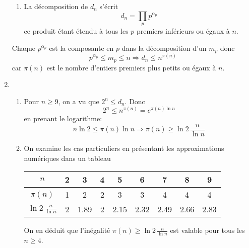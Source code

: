 \begin{enumerate}
\begin{enumerate}
 \item   La décomposition de $d_n$ s'écrit
\begin{displaymath}
 d_n = \prod_p p^{\alpha_p}
\end{displaymath}
ce produit étant étendu à tous les $p$ premiers inférieurs ou égaux à $n$.
\end{enumerate}
Chaque $p^{\alpha_p}$ est la composante en $p$ dans la décomposition d'un $m_p$ donc 
\begin{displaymath}
 p^{\alpha_p}\leq m_p \leq n\Rightarrow d_n \leq n^{\pi(n)}
\end{displaymath}
car $\pi(n)$ est le nombre d'entiers premiers plus petits ou égaux à $n$.
 \item  
\begin{enumerate}
 \item Pour $n\geq 9$, on a vu que $2^n\leq d_n$. Donc
\begin{displaymath}
 2^n\leq n^{\pi(n)} = e^{\pi(n)\ln n}
\end{displaymath}
en prenant le logarithme:
\begin{displaymath}
 n\ln 2\leq \pi(n)\ln n
\Rightarrow \pi(n) \geq \ln 2 \, \frac{n}{\ln n}
\end{displaymath}

 \item  On examine les cas particuliers en présentant les approximations numériques dans un tableau
\begin{center}
\renewcommand{\arraystretch}{2}
\begin{tabular}{|c|c|c|c|c|c|c|c|c|} \hline
$n$      & 2 & 3 & 4 & 5 & 6 & 7 & 8 & 9\\ \hline
$\pi(n)$ & 1 & 2 & 2 & 3 & 3 & 4 & 4 & 4 \\ \hline
$\ln 2\,\frac{n}{\ln n}$& 2 & 1.89 & 2 & 2.15 & 2.32 & 2.49 & 2.66 & 2.83 \\ \hline
\end{tabular}
\end{center}
\bigskip On en déduit que l'inégalité $\pi(n) \geq \ln 2 \,\frac{n}{\ln n}$ est valable pour tous les $n\geq 4$.
\end{enumerate}
\end{enumerate}
